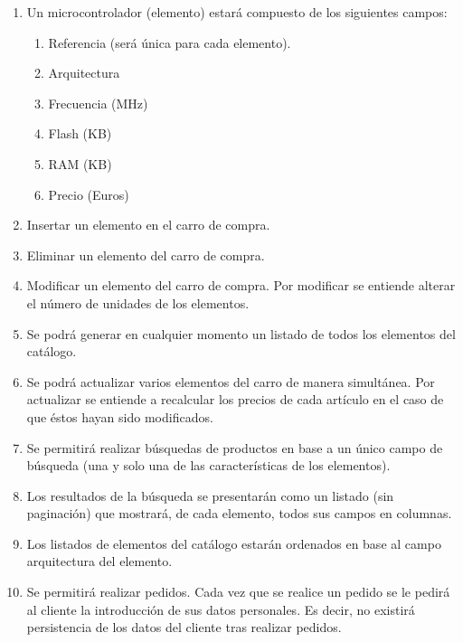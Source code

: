 \begin{enumerate}[label=\bf RF\twodigits*.,leftmargin=*]
\setlength{\itemindent}{0pt}
\item Un microcontrolador (elemento) estará compuesto de los siguientes campos: 
	\begin{enumerate}[label=\textbf{\arabic*} -]
		\item Referencia (será única para cada elemento).
        \item Arquitectura
        \item Frecuencia (MHz)
        \item Flash (KB)
        \item RAM (KB)
        \item Precio (Euros)
	\end{enumerate}
	
\item Insertar un elemento en el carro de compra.
   
\item Eliminar un elemento del carro de compra.
	
\item Modificar un elemento del carro de compra. Por modificar se entiende alterar el número de unidades de los elementos.

\item Se podrá generar en cualquier momento un listado de todos los elementos del catálogo.

\item Se podrá actualizar varios elementos del carro de manera simultánea. Por actualizar se entiende a recalcular los precios de cada artículo en el caso de que éstos hayan sido modificados.

\item Se permitirá realizar búsquedas de productos en base a un único campo de búsqueda (una y solo una de las características de los elementos).
	
\item Los resultados de la búsqueda se presentarán como un listado (sin paginación) que mostrará, de cada elemento, todos sus campos en columnas.

\item Los listados de elementos del catálogo estarán ordenados en base al campo arquitectura del elemento.

\item Se permitirá realizar pedidos. Cada vez que se realice un pedido se le pedirá al cliente la introducción de sus datos personales. Es decir, no existirá persistencia de los datos del cliente tras realizar pedidos.


\end{enumerate}
